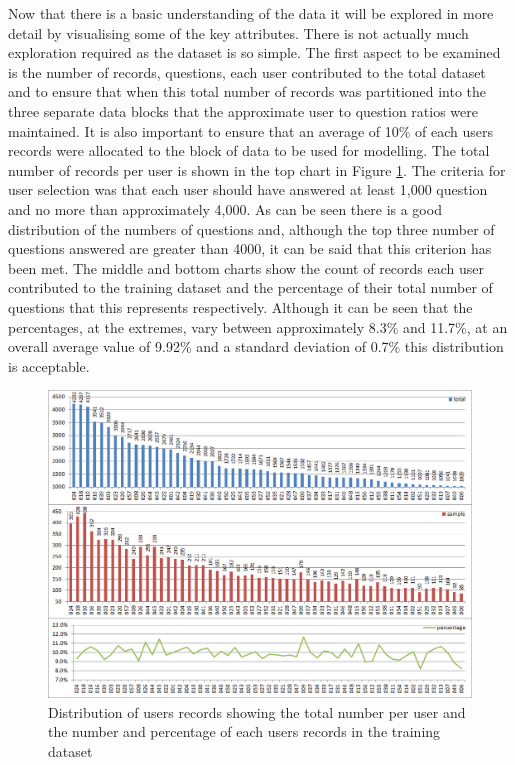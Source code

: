 Now that there is a basic understanding of the data it will be explored in more detail by visualising some of the key attributes. There is not actually much exploration required as the dataset is so simple. The first aspect to be examined is the number of records, questions, each user contributed to the total dataset and to ensure that when this total number of records was partitioned into the three separate data blocks that the approximate user to question ratios were maintained. It is also important to ensure that an average of 10\% of each users records were allocated to the block of data to be used for modelling. The total number of records per user is shown in the top chart in Figure \ref{fig:chapter4:user_distributions}. The criteria for user selection was that each user should have answered at least 1,000 question and no more than approximately 4,000. As can be seen there is a good distribution of the numbers of questions and, although the top three number of questions answered are greater than 4000, it can be said that this criterion has been met. The middle and bottom charts show the count of records each user contributed to the training dataset and the percentage of their total number of questions that this represents respectively. Although it can be seen that the percentages, at the extremes, vary between approximately 8.3\% and 11.7\%, at an overall average value of 9.92\% and a standard deviation of 0.7\% this distribution is acceptable.

\begin{figure}[htbp]
	\centering
	\includegraphics[width=1\textwidth]{Figures/Chapter4/user_distributions.jpg}
	\caption[Distribution of user records]{Distribution of users records showing the total number per user and the number and percentage of each users records in the training dataset}
	\label{fig:chapter4:user_distributions}
\end{figure}

